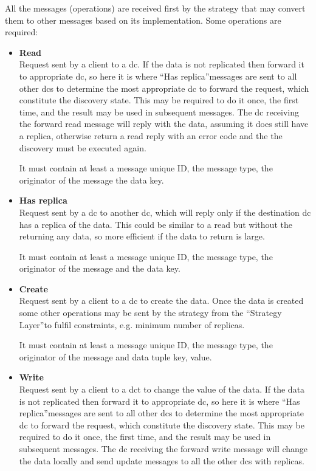 \documentclass[english]{article}
\begin{document}
All the messages (operations) are received first by the strategy that may convert them to other messages based on its implementation. Some operations are required:
\begin{itemize}	
	\item {\bf Read}\\
	Request sent by a client to a \gls{dc}. If the data is not replicated then forward it to appropriate \gls{dc}, so here it is where \textquotedblleft Has replica\textquotedblright messages are sent to all other \glspl{dc} to determine the most appropriate \gls{dc} to forward the request, which constitute the discovery state. This may be required to do it once, the first time, and the result may be used in subsequent messages. The \gls{dc} receiving the forward read message will reply with the data, assuming it does still have a replica, otherwise return a read reply with an error code and the the discovery must be executed again.
	
	It must contain at least a message unique ID, the message type, the originator of the message the data key.
	
	\item {\bf Has replica}\\
	Request sent by a \gls{dc} to another \gls{dc}, which will reply only if the destination \gls{dc} has a replica of the data. This could be similar to a read but without the returning any data, so more efficient if the data to return is large.
	
	It must contain at least  a message unique ID, the message type, the originator of the message and the data key.

	\item {\bf Create}\\
	Request sent by a client to a \gls{dc} to create the data. Once the data is created some other operations may be sent by the strategy from the \textquotedblleft Strategy Layer\textquotedblright to fulfil constraints, e.g. minimum number of replicas.
	
	It must contain at least  a message unique ID, the message type, the originator of the message and data tuple key, value.

	\item {\bf Write}\\
	Request sent by a client to a \gls{dc}t to change the value of the data. If the data is not replicated then forward it to appropriate \gls{dc}, so here it is where \textquotedblleft Has replica\textquotedblright messages are sent to all other \glspl{dc} to determine the most appropriate \gls{dc} to forward the request, which constitute the discovery state. This may be required to do it once, the first time, and the result may be used in subsequent messages. The \gls{dc} receiving the forward write message will change the data locally and send update messages to all the other \glspl{dc} with replicas.
	

\end{itemize}
\end{document}

